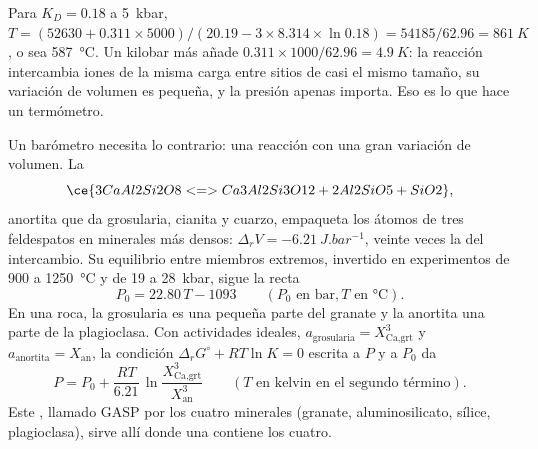 \begin{omfigure}
\centering
{}
\par{}
\end{omfigure}

Para $K_D = 0.18$ a \qty{5}{kbar}, $T = (52630 + 0.311\times5000)/(20.19 - 3\times8.314
\times\ln 0.18) = 54185/62.96 = \qty{861}{K}$, o sea \qty{587}{\celsius}. Un kilobar más
añade $0.311\times1000/62.96 = \qty{4.9}{K}$: la reacción intercambia iones de la misma carga
entre sitios de casi el mismo tamaño, su variación de volumen es pequeña, y la presión apenas
importa. Eso es lo que hace un termómetro.

Un barómetro necesita lo contrario: una reacción con una gran variación de volumen. La 
\[
\ce{3 CaAl2Si2O8 <=> Ca3Al2Si3O12 + 2 Al2SiO5 + SiO2},
\]
anortita que da grosularia, cianita y cuarzo, empaqueta los átomos de tres feldespatos en
minerales más densos: $\Delta_r V = \qty{-6.21}{J.bar^{-1}}$, veinte veces la del intercambio.
Su equilibrio entre miembros extremos, invertido en experimentos de 900 a \qty{1250}{\celsius} y de 19
a \qty{28}{kbar}, sigue la recta
\[
P_0 = 22.80\,T - 1093 \qquad (P_0 \text{ en bar}, T \text{ en } \unit{\celsius}).
\]
En una roca, la grosularia es una pequeña parte del granate y la anortita una parte de la
plagioclasa. Con actividades ideales, $a_{\text{grosularia}} = X_{\text{Ca,grt}}^3$ y
$a_{\text{anortita}} = X_{\text{an}}$, la condición $\Delta_r G^\circ + RT\ln K = 0$
escrita a $P$ y a $P_0$ da
\[
P = P_0 + \frac{RT}{6.21}\,\ln\frac{X_{\text{Ca,grt}}^3}{X_{\text{an}}^3}
\qquad (T \text{ en kelvin en el segundo término}).
\]
Este , llamado GASP por los cuatro minerales (granate, aluminosilicato, sílice,
plagioclasa), sirve allí donde una  contiene los cuatro.

